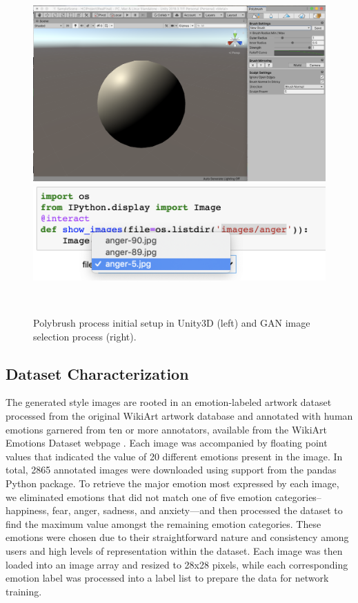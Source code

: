 \documentclass{sigchi}
\begin{document}
\begin{figure}
  \includegraphics[width=2\columnwidth]{figures/polybrushstart}
  \includegraphics[width=2\columnwidth]{figures/selection}
  \caption{Polybrush process initial setup in Unity3D (left) 
  and GAN image selection process (right).}~\label{fig:figure1}
\end{figure}

\subsection{Dataset Characterization}
The generated style images are rooted in an emotion-labeled artwork dataset processed from the original WikiArt artwork database and annotated with human emotions garnered from ten or more annotators, available from the WikiArt Emotions Dataset webpage \cite{LREC18-ArtEmo}. Each image was accompanied by floating point values that indicated the value of 20 different emotions present in the image. In total, 2865 annotated images were downloaded using support from the pandas Python package. To retrieve the major emotion most expressed by each image, we eliminated emotions that did not match one of five emotion categories-- happiness, fear, anger, sadness, and anxiety—and then processed the dataset to find the maximum value amongst the remaining emotion categories. These emotions were chosen due to their straightforward nature and consistency among users and high levels of representation within the dataset. Each image was then loaded into an image array and resized to 28x28 pixels, while each corresponding emotion label was processed into a label list to prepare the data for network training.
\end{document}
